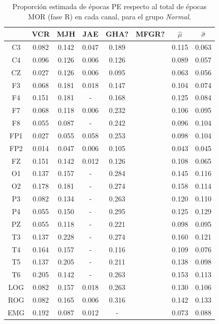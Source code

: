 \begin{table}
\centering
\begin{tabular}{c|ccccc|cc}
& VCR & MJH & JAE & GHA? & MFGR? & $\widehat{\mu}$ & $\widehat{\sigma}$ \\
\hline
 C3 & 0.082    & 0.142    & 0.047    & 0.189    && 0.115    & 0.063     \\
 C4 & 0.096    & 0.126    & 0.006    & 0.126    && 0.089    & 0.057     \\
 CZ & 0.027    & 0.126    & 0.006    & 0.095    && 0.063    & 0.056     \\
 F3 & 0.068    & 0.181    & 0.018    & 0.147    && 0.104    & 0.074     \\
 F4 & 0.151    & 0.181    & -      & 0.168    && 0.125    & 0.084     \\
 F7 & 0.068    & 0.118    & 0.006    & 0.232    && 0.106    & 0.095     \\
 F8 & 0.055    & 0.087    & -      & 0.242    && 0.096    & 0.104     \\
 FP1 & 0.027    & 0.055    & 0.058    & 0.253    && 0.098    & 0.104     \\ 
 FP2 & 0.014    & 0.047    & 0.006    & 0.105    && 0.043    & 0.045     \\ 
 FZ & 0.151    & 0.142    & 0.012    & 0.126    && 0.108    & 0.065     \\
 O1 & 0.137    & 0.157    & -      & 0.284    && 0.145    & 0.116     \\
 O2 & 0.178    & 0.181    & -      & 0.274    && 0.158    & 0.114     \\
 P3 & 0.082    & 0.134    & -      & 0.263    && 0.120    & 0.110     \\
 P4 & 0.055    & 0.150    & -      & 0.295    && 0.125    & 0.129     \\
 PZ & 0.055    & 0.118    & -      & 0.221    && 0.098    & 0.095     \\
 T3 & 0.137    & 0.228    & -      & 0.274    && 0.160    & 0.121     \\
 T4 & 0.164    & 0.157    & -      & 0.116    && 0.109    & 0.076     \\
 T5 & 0.137    & 0.205    & -      & 0.211    && 0.138    & 0.098     \\
 T6 & 0.205    & 0.142    & -      & 0.263    && 0.153    & 0.113     \\
 LOG & 0.082    & 0.157    & 0.018    & 0.263    && 0.130    & 0.106     \\
 ROG & 0.082    & 0.165    & 0.006    & 0.316    && 0.142    & 0.133     \\
 EMG & 0.192    & 0.087    & 0.012    & -      && 0.073    & 0.088    
\end{tabular}
\caption{Proporci\'on estimada de \'epocas PE respecto al total de \'epocas MOR 
(fase R) en cada
canal, para el grupo \textit{Normal}.}
\label{gpo_NN_mor}
\end{table}

